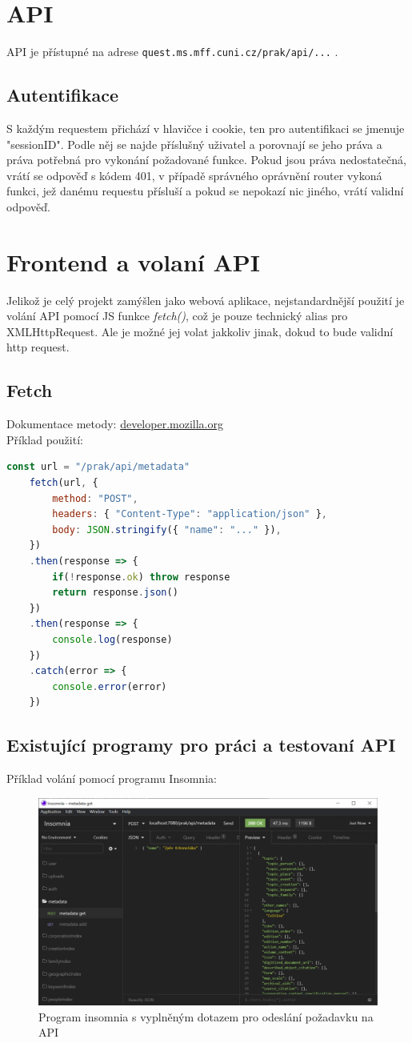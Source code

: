 \section{API}
API je přístupné na adrese \texttt{quest.ms.mff.cuni.cz/prak/api/...} .

\subsection{Autentifikace}
S každým requestem přichází v hlavičce i cookie, ten pro
autentifikaci se jmenuje "sessionID".
Podle něj se najde příslušný uživatel a porovnají se jeho práva a
práva potřebná pro vykonání požadované funkce. Pokud jsou práva nedostatečná,
vrátí se odpověď s kódem 401, v případě správného oprávnění router vykoná funkci,
jež danému requestu přísluší a pokud se nepokazí nic jiného, vrátí validní odpověď.

\section{Frontend a volaní API}
Jelikož je celý projekt zamýšlen jako webová aplikace, nejstandardnější použití
je volání API pomocí JS funkce \textit{fetch()}, což je pouze technický alias pro XMLHttpRequest.
Ale je možné jej volat jakkoliv jinak, dokud to bude validní http request.

\subsection{Fetch}
Dokumentace metody: \href{https://developer.mozilla.org/en-US/docs/Web/API/Fetch_API}{developer.mozilla.org}
\\
Příklad použití:
\\
\begin{lstlisting}[language=JavaScript]
	const url = "/prak/api/metadata" 
	fetch(url, {
		method: "POST",
		headers: { "Content-Type": "application/json" },
		body: JSON.stringify({ "name": "..." }),
	})
	.then(response => {
		if(!response.ok) throw response
		return response.json()
	})
	.then(response => {
		console.log(response)
	})
	.catch(error => {
		console.error(error)
	})
\end{lstlisting}

\subsection{Existující programy pro práci a testovaní API}
Příklad volání pomocí programu Insomnia:
\begin{figure}[H]
	\centering
	\includegraphics[width=\linewidth]{img/InsomniaExample.PNG}
	\caption{Program insomnia s vyplněným dotazem pro odeslání požadavku na API}
\end{figure}

